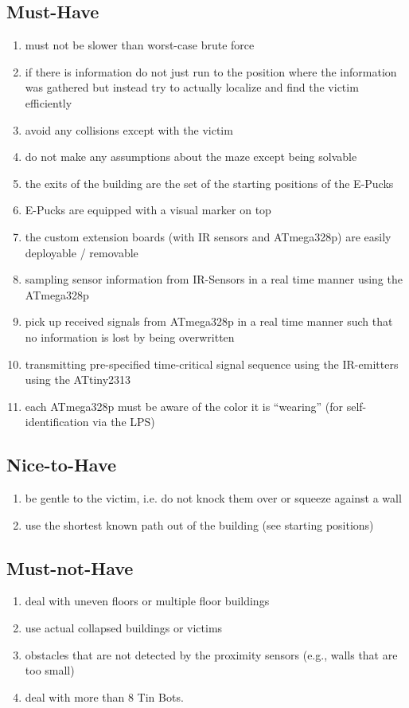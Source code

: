 \documentclass[a4paper,parskip,headheight=38pt]{scrartcl} %
\begin{document}
\subsection{Must-Have}
\begin{enumerate}[label=\musthave]
\item must not be slower than worst-case brute force
\item if there is information do not just run to the position where the information was gathered but instead try to actually localize and find the victim efficiently
\item avoid any collisions except with the victim
\item do not make any assumptions about the maze except being solvable
\item the exits of the building are the set of the starting positions of the E-Pucks
\item E-Pucks are equipped with a visual marker on top
\item the custom extension boards (with IR sensors and ATmega328p) are easily deployable / removable
\item sampling sensor information from IR-Sensors in a real time manner using the ATmega328p 
\item pick up received signals from ATmega328p in a real time manner such that no information is lost by being overwritten
\item transmitting pre-specified time-critical signal sequence using the IR-emitters using the ATtiny2313
\item each ATmega328p must be aware of the color it is \enquote{wearing} (for self-identification via the LPS)
\end{enumerate}

\subsection{Nice-to-Have}
\begin{enumerate}[label=\nicetohave]
\item be gentle to the victim, i.e. do not knock them over or squeeze against a wall
\item use the shortest known path out of the building (see starting positions)
\end{enumerate}

\subsection{Must-not-Have}
\begin{enumerate}[label=\mustnothave]
\item deal with uneven floors or multiple floor buildings
\item use actual collapsed buildings or victims
\item obstacles that are not detected by the proximity sensors (e.g., walls that are too small)
\item deal with more than 8 Tin Bots.
\end{enumerate}
\end{document}
